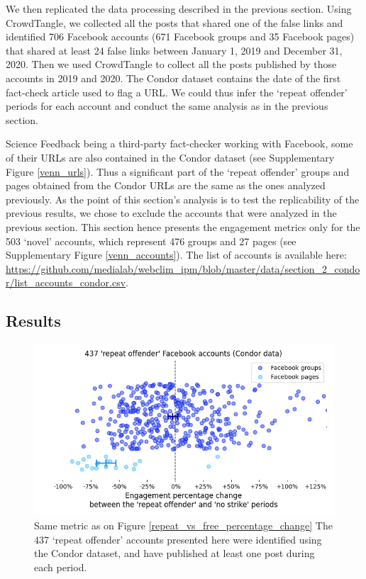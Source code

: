 \documentclass[review]{elsarticle}
\begin{document}
We then replicated the data processing described in the previous section.
Using CrowdTangle, we collected all the posts that shared one of the false links and identified 706 Facebook accounts (671 Facebook groups and 35 Facebook pages) that shared at least 24 false links between January 1, 2019 and December 31, 2020.
Then we used CrowdTangle to collect all the posts published by those accounts in 2019 and 2020.
The Condor dataset contains the date of the first fact-check article used to flag a URL. We could thus infer the `repeat offender' periods for each account and conduct the same analysis as in the previous section.

Science Feedback being a third-party fact-checker working with Facebook, some of their URLs are also contained in the Condor dataset (see Supplementary Figure \ref{venn_urls}).
Thus a significant part of the `repeat offender' groups and pages obtained from the Condor URLs are the same as the ones analyzed previously. 
As the point of this section’s analysis is to test the replicability of the previous results, we chose to exclude the accounts that were analyzed in the previous section. 
This section hence presents the engagement metrics only for the 503 `novel' accounts, which represent 476 groups and 27 pages (see Supplementary Figure \ref{venn_accounts}).
The list of accounts is available here: \url{https://github.com/medialab/webclim_ipm/blob/master/data/section_2_condor/list_accounts_condor.csv}.
 
\subsection{Results}

\begin{figure}[!h]
\centering
\includegraphics[scale=0.5]{./../figure/condor_repeat_vs_free_percentage_change.png}
\caption{
Same metric as on Figure \ref{repeat_vs_free_percentage_change}
The 437 `repeat offender' accounts presented here were identified using the Condor dataset, and have published at least one post during each period.
}
\label{condor_repeat_vs_free_percentage_change}
\end{figure}
\end{document}
